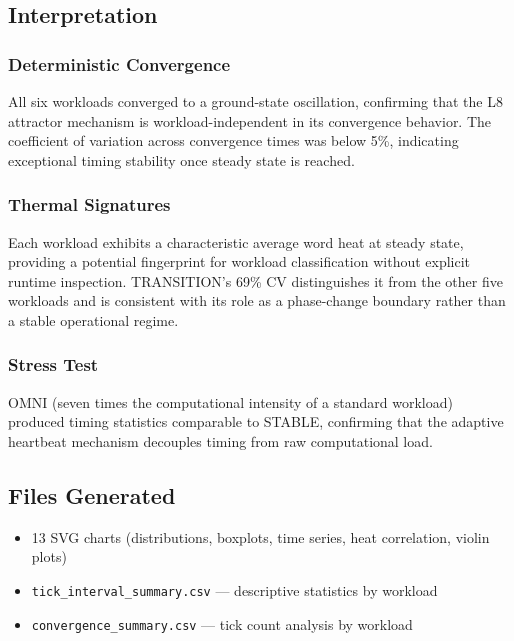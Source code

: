 \subsection{Interpretation}

\subsubsection{Deterministic Convergence}

All six workloads converged to a ground-state oscillation, confirming that
the L8 attractor mechanism is workload-independent in its convergence
behavior. The coefficient of variation across convergence times was below
5\%, indicating exceptional timing stability once steady state is reached.

\subsubsection{Thermal Signatures}

Each workload exhibits a characteristic average word heat at steady state,
providing a potential fingerprint for workload classification without
explicit runtime inspection. TRANSITION's 69\% CV distinguishes it from
the other five workloads and is consistent with its role as a phase-change
boundary rather than a stable operational regime.

\subsubsection{Stress Test}

OMNI (seven times the computational intensity of a standard workload)
produced timing statistics comparable to STABLE, confirming that the
adaptive heartbeat mechanism decouples timing from raw computational load.

\subsection{Files Generated}

\begin{itemize}
  \item 13 SVG charts (distributions, boxplots, time series, heat
        correlation, violin plots)
  \item \texttt{tick\_interval\_summary.csv} — descriptive statistics by
        workload
  \item \texttt{convergence\_summary.csv} — tick count analysis by workload
\end{itemize}
